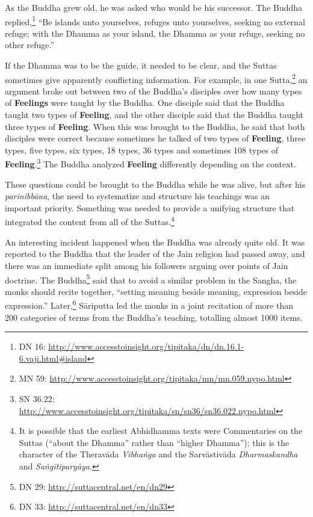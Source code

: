 As the Buddha grew old, he was asked who would be his successor. The Buddha replied,\footnote{DN 16: \url{http://www.accesstoinsight.org/tipitaka/dn/dn.16.1-6.vaji.html\#island}} “Be islands unto yourselves, refuges unto yourselves, seeking no external refuge; with the Dhamma as your island, the Dhamma as your refuge, seeking no other refuge.”

If the Dhamma was to be the guide, it needed to be clear, and the Suttas sometimes give apparently conflicting information. For example, in one Sutta,\footnote{MN 59: \url{http://www.accesstoinsight.org/tipitaka/mn/mn.059.nypo.html}} an argument broke out between two of the Buddha’s disciples over how many types of \textbf{Feelings} were taught by the Buddha. One disciple said that the Buddha taught two types of \textbf{Feeling}, and the other disciple said that the Buddha taught three types of \textbf{Feeling}. When this was brought to the Buddha, he said that both disciples were correct because sometimes he talked of two types of \textbf{Feeling}, three types, five types, six types, 18 types, 36 types and sometimes 108 types of \textbf{Feeling}.\footnote{SN 36.22: \url{http://www.accesstoinsight.org/tipitaka/sn/sn36/sn36.022.nypo.html}} The Buddha analyzed \textbf{Feeling} differently depending on the context.

These questions could be brought to the Buddha while he was alive, but after his \textit{parinibbāna}, the need to systematize and structure his teachings was an important priority. Something was needed to provide a unifying structure that integrated the content from all of the Suttas.\footnote{It is possible that the earliest Abhidhamma texts were Commentaries on the Suttas (“about the Dhamma” rather than “higher Dhamma”); this is the character of the Theravāda \textit{Vibhaṅga} and the Sarvāstivāda \textit{Dharmaskandha} and \textit{Saṅgītiparyāya}.}

An interesting incident happened when the Buddha was already quite old. It was reported to the Buddha that the leader of the Jain religion had passed away, and there was an immediate split among his followers arguing over points of Jain doctrine. The Buddha\footnote{DN 29: \url{http://suttacentral.net/en/dn29}} said that to avoid a similar problem in the Sangha, the monks should recite together, “setting meaning beside meaning, expression beside expression.” Later,\footnote{DN 33: \url{http://suttacentral.net/en/dn33}} Sāriputta led the monks in a joint recitation of more than 200 categories of terms from the Buddha’s teaching, totalling almost 1000 items. 

